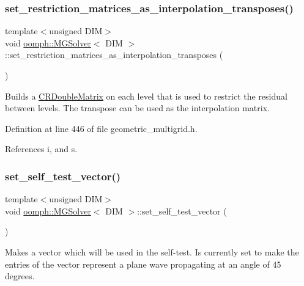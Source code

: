 \subsubsection{\texorpdfstring{set\+\_\+restriction\+\_\+matrices\+\_\+as\+\_\+interpolation\+\_\+transposes()}{set\_restriction\_matrices\_as\_interpolation\_transposes()}}
{\footnotesize\ttfamily template$<$unsigned D\+IM$>$ \\
void \hyperlink{classoomph_1_1MGSolver}{oomph\+::\+M\+G\+Solver}$<$ D\+IM $>$\+::set\+\_\+restriction\+\_\+matrices\+\_\+as\+\_\+interpolation\+\_\+transposes (\begin{DoxyParamCaption}{ }\end{DoxyParamCaption})\hspace{0.3cm}{\ttfamily [inline]}}



Builds a \hyperlink{classoomph_1_1CRDoubleMatrix}{C\+R\+Double\+Matrix} on each level that is used to restrict the residual between levels. The transpose can be used as the interpolation matrix. 



Definition at line 446 of file geometric\+\_\+multigrid.\+h.



References i, and s.

\mbox{\label{classoomph_1_1MGSolver_a081eb7bcdd49dfce9a03f0ae3ab4cfab}} 
\subsubsection{\texorpdfstring{set\+\_\+self\+\_\+test\+\_\+vector()}{set\_self\_test\_vector()}}
{\footnotesize\ttfamily template$<$unsigned D\+IM$>$ \\
void \hyperlink{classoomph_1_1MGSolver}{oomph\+::\+M\+G\+Solver}$<$ D\+IM $>$\+::set\+\_\+self\+\_\+test\+\_\+vector (\begin{DoxyParamCaption}{ }\end{DoxyParamCaption})}



Makes a vector which will be used in the self-\/test. Is currently set to make the entries of the vector represent a plane wave propagating at an angle of 45 degrees. 

